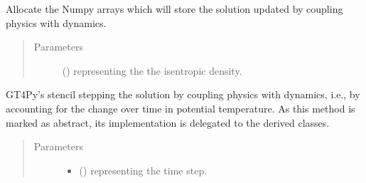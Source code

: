 \documentclass[letterpaper,10pt,english]{sphinxmanual}
\begin{document}
\begin{fulllineitems}
\begin{fulllineitems}
\begin{quote}
\begin{description}
\end{description}\end{quote}

\end{fulllineitems}


\begin{fulllineitems}
\label{\detokenize{api:dycore.prognostic_isentropic.PrognosticIsentropic._stencil_stepping_by_coupling_physics_with_dynamics_allocate_outputs}}
Allocate the Numpy arrays which will store the solution updated by coupling physics with dynamics.
\begin{quote}\begin{description}
\item[{Parameters}] \leavevmode
{} () \textendash{}  representing the the isentropic density.

\end{description}\end{quote}

\end{fulllineitems}


\begin{fulllineitems}
\label{\detokenize{api:dycore.prognostic_isentropic.PrognosticIsentropic._stencil_stepping_by_coupling_physics_with_dynamics_defs}}
GT4Py’s stencil stepping the solution by coupling physics with dynamics, i.e., by accounting for the
change over time in potential temperature.
As this method is marked as abstract, its implementation is delegated to the derived classes.
\begin{quote}\begin{description}
\item[{Parameters}] \leavevmode\begin{itemize}
\item {} 
 () \textendash{}  representing the time step.


\end{itemize}
\end{description}
\end{quote}
\end{fulllineitems}
\end{fulllineitems}
\end{document}
